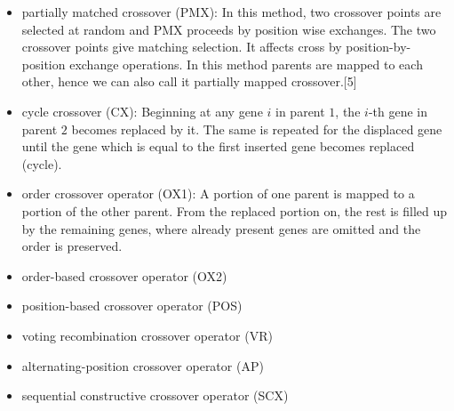 \documentclass[a4paper, 12pt]{article}
\begin{document}
\begin{itemize}
\item  partially matched crossover (PMX): In this method, two crossover points are selected at random and PMX proceeds by position wise exchanges. The two crossover points give matching selection. It affects cross by position-by-position exchange operations. In this method parents are mapped to each other, hence we can also call it partially mapped crossover.[5]
\item  cycle crossover (CX): Beginning at any gene $i$ in parent $1$, the $i$-th gene in parent $2$ becomes replaced by it. The same is repeated for the displaced gene until the gene which is equal to the first inserted gene becomes replaced (cycle).
\item  order crossover operator (OX1): A portion of one parent is mapped to a portion of the other parent. From the replaced portion on, the rest is filled up by the remaining genes, where already present genes are omitted and the order is preserved.
\item order-based crossover operator (OX2)
\item position-based crossover operator (POS)
\item voting recombination crossover operator (VR)
\item alternating-position crossover operator (AP)
\item sequential constructive crossover operator (SCX)
\end{itemize}
\end{document}
